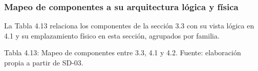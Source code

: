 \documentclass[11pt]{article}
\begin{document}
\subsubsection{Mapeo de componentes a su arquitectura lógica y física}

La Tabla 4.13 relaciona los componentes de la sección 3.3 con su vista lógica en 4.1 y su emplazamiento físico en esta sección, agrupados por familia.

\par\vspace{0pt plus 10\baselineskip}\vspace{0pt plus -10\baselineskip}

Tabla 4.13: Mapeo de componentes entre 3.3, 4.1 y 4.2. Fuente: elaboración propia a partir de SD-03.\par\nopagebreak
\end{document}
